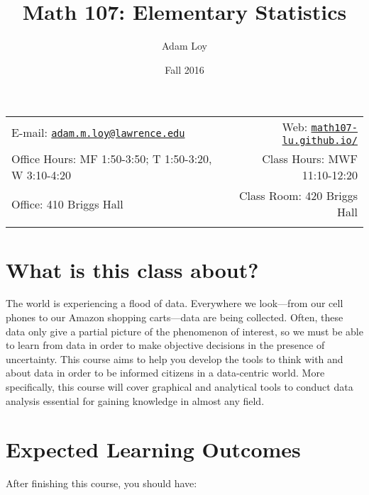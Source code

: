 \documentclass[11pt,]{article}
\title{Math 107: Elementary Statistics}
\author{Adam Loy}
\date{Fall 2016}
\begin{document}
  

		\maketitle
		
	
		\thispagestyle{firststyle}



	\noindent \begin{tabular*}{\textwidth}{ @{\extracolsep{\fill}} lr @{\extracolsep{\fill}}}


E-mail: \texttt{\href{mailto:adam.m.loy@lawrence.edu}{\nolinkurl{adam.m.loy@lawrence.edu}}} & Web: \href{http://math107-lu.github.io/}{\tt math107-lu.github.io/}\\
Office Hours: MF 1:50-3:50; T 1:50-3:20, W 3:10-4:20  &  Class Hours: MWF 11:10-12:20\\
Office: 410 Briggs Hall  & Class Room: 420 Briggs Hall\\
	&  \\
	\hline
	\end{tabular*}
	
\vspace{2mm}
	


\section{What is this class about?}\label{what-is-this-class-about}

The world is experiencing a flood of data. Everywhere we look---from our
cell phones to our Amazon shopping carts---data are being collected.
Often, these data only give a partial picture of the phenomenon of
interest, so we must be able to learn from data in order to make
objective decisions in the presence of uncertainty. This course aims to
help you develop the tools to think with and about data in order to be
informed citizens in a data-centric world. More specifically, this
course will cover graphical and analytical tools to conduct data
analysis essential for gaining knowledge in almost any field.

\section{Expected Learning Outcomes}\label{expected-learning-outcomes}

After finishing this course, you should have:
\end{document}
